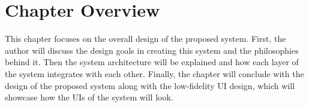 \section{Chapter Overview}

This chapter focuses on the overall design of the proposed system. First, the author will discuss the design goals in creating this system and the philosophies behind it. Then the system architecture will be explained and how each layer of the system integrates with each other. Finally, the chapter will conclude with the design of the proposed system along with the low-fidelity UI design, which will showcase how the UIs of the system will look. 